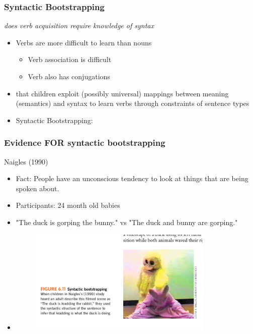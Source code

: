 \documentclass{beamer}
\begin{document}
\begin{frame}
\frametitle{Syntactic Bootstrapping}
\textit{does verb acquisition require knowledge of syntax}
\begin{itemize}
\item Verbs are more difficult to learn than nouns 
\begin{itemize}
    \item Verb association is difficult
    \item Verb also has conjugations
\end{itemize}
\item that children exploit (possibly universal) mappings between meaning (semantics) and syntax to learn verbs through constraints of sentence types
\item Syntactic Bootstrapping: 
\end{itemize}
\end{frame}
\begin{frame}
\frametitle{Evidence FOR syntactic bootstrapping}
Naigles (1990)
\begin{itemize}
    \item Fact: People have an unconscious tendency to look at things that are being spoken about.
    \item Participants: 24 month old babies
    \item "The duck is gorping the bunny." vs "The duck and bunny are gorping."
    \item \begin{figure}
        \includegraphics[height = 5cm, width = \textwidth]{111111.png}
    \end{figure}
\end{itemize}
\end{frame}
\end{document}
